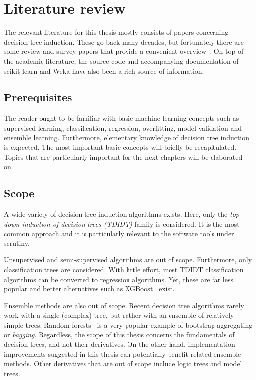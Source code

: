 \chapter{Literature review}\label{cha:literature}
The relevant literature for this thesis mostly consists of papers concerning decision tree induction. These go back many decades, but fortunately there are some review and survey papers that provide a convenient overview~\cite{murthy1998automatic, rokach2005top, kotsiantis2007supervised}. On top of the academic literature, the source code and accompanying documentation of scikit-learn and Weka have also been a rich source of information.

\section{Prerequisites}
The reader ought to be familiar with basic machine learning concepts such as supervised learning, classification, regression, overfitting, model validation and ensemble learning. Furthermore, elementary knowledge of decision tree induction is expected. The most important basic concepts will briefly be recapitulated. Topics that are particularly important for the next chapters will be elaborated on.

\section{Scope}
A wide variety of decision tree induction algorithms exists. Here, only the \emph{top down induction of decision trees (TDIDT)} family is considered. It is the most common approach and it is particularly relevant to the software tools under scrutiny.

Unsupervised and semi-supervised algorithms are out of scope. Furthermore, only classification trees are considered. With little effort, most TDIDT classification algorithms can be converted to regression algorithms. Yet, these are far less popular and better alternatives such as XGBoost~\cite{xgboost} exist.

Ensemble methods are also out of scope. Recent decision tree algorithms rarely work with a single (complex) tree, but rather with an ensemble of relatively simple trees. Random forests~\cite{rf} is a very popular example of bootstrap aggregating or \emph{bagging}. Regardless, the scope of this thesis concerns the fundamentals of decision trees, and not their derivatives. On the other hand, implementation improvements suggested in this thesis can potentially benefit related ensemble methods. Other derivatives that are out of scope include logic trees and model trees.

